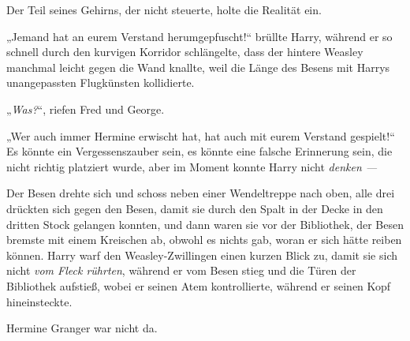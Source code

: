 Der Teil seines Gehirns, der nicht steuerte, holte die Realität ein.

„Jemand hat an eurem Verstand herumgepfuscht!“ brüllte Harry, während er so schnell durch den kurvigen Korridor schlängelte, dass der hintere Weasley manchmal leicht gegen die Wand knallte, weil die Länge des Besens mit Harrys unangepassten Flugkünsten kollidierte.

„\emph{Was?}“, riefen Fred und George.

„Wer auch immer Hermine erwischt hat, hat auch mit eurem Verstand gespielt!“ Es könnte ein Vergessenszauber sein, es könnte eine falsche Erinnerung sein, die nicht richtig platziert wurde, aber im Moment konnte Harry nicht \emph{denken —}

Der Besen drehte sich und schoss neben einer Wendeltreppe nach oben, alle drei drückten sich gegen den Besen, damit sie durch den Spalt in der Decke in den dritten Stock gelangen konnten, und dann waren sie vor der Bibliothek, der Besen bremste mit einem Kreischen ab, obwohl es nichts gab, woran er sich hätte reiben können. Harry warf den Weasley-Zwillingen einen kurzen Blick zu, damit sie sich nicht \emph{vom Fleck rührten}, während er vom Besen stieg und die Türen der Bibliothek aufstieß, wobei er seinen Atem kontrollierte, während er seinen Kopf hineinsteckte.

Hermine Granger war nicht da.


